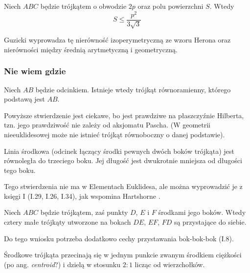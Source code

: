 \begin{proposition}
	Niech $ABC$ będzie trójkątem o obwodzie $2p$ oraz polu powierzchni $S$.
	Wtedy
	\begin{equation}
		S \le \frac{p^2}{3 \sqrt{3}}
	\end{equation}
\end{proposition}

Guzicki wyprowadza tę nierówność izoperymetryczną ze wzoru Herona oraz nierówności między średnią arytmetyczną i geometryczną.


\subsubsection{Nie wiem gdzie}

\begin{proposition}
	\label{hartshorne_52}
    Niech $AB$ będzie odcinkiem.
	Istnieje wtedy trójkąt równoramienny, którego podstawą jest $AB$.
\end{proposition}

Powyższe stwierdzenie jest ciekawe, bo jest prawdziwe na płaszczyźnie Hilberta, tzn. jego prawdziwość nie zależy od aksjomatu Pascha.
(W geometrii nieeuklidesowej może nie istnieć trójkąt równoboczny o danej podstawie).

\begin{proposition}
	\label{hartshorne_52}
	Linia środkowa (odcinek łączący środki pewnych dwóch boków trójkąta) jest równoległa do trzeciego boku.
    Jej długość jest dwukrotnie mniejsza od długości tego boku.
\end{proposition}

Tego stwierdzenia nie ma w Elementach Euklidesa, ale można wyprowadzić je z księgi I (I.29, I.26, I.34), jak wspomina Hartshorne \cite[s. 52. 53]{hartshorne2000}.

\begin{corollary}
	Niech $ABC$ będzie trójkątem, zaś punkty $D$, $E$ i $F$ środkami jego boków.
	Wtedy cztery małe trójkąty utworzone na bokach $DE$, $EF$, $FD$ są przystające do siebie.
\end{corollary}

Do tego wniosku potrzeba dodatkowo cechy przystawania bok-bok-bok (I.8).

\begin{proposition}
	\label{srodkowe_przecinaja_sie}
	Środkowe trójkąta przecinają się w jednym punkcie zwanym środkiem ciężkości (po ang. \emph{centroid}?) i dzielą w stosunku $2 : 1$ licząc od wierzchołków.
\end{proposition}

